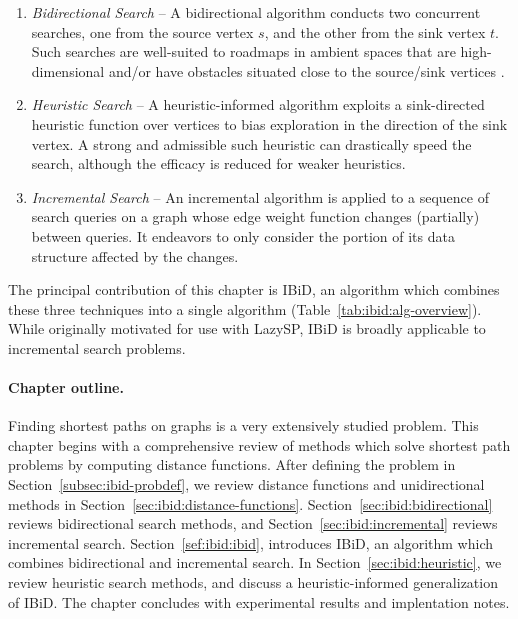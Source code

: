 \begin{enumerate}
\item \emph{Bidirectional Search} -- A bidirectional algorithm
   conducts two concurrent searches,
   one from the source vertex $s$,
   and the other from the sink vertex $t$.
   Such searches are well-suited to roadmaps in ambient spaces that
   are high-dimensional  and/or have
   obstacles situated close to the source/sink vertices
   .
\item \emph{Heuristic Search} -- A heuristic-informed algorithm
   exploits a sink-directed heuristic function over vertices to bias
   exploration in the direction of the sink vertex.
   A strong and admissible such heuristic can drastically speed the
   search, 
   although the efficacy is reduced for weaker heuristics.
\item \emph{Incremental Search} -- An incremental algorithm
   is applied to a sequence of search queries on a graph whose
   edge weight function changes (partially) between queries.
   It endeavors to only consider the portion of its data structure
   affected by the changes. 
\end{enumerate}

The principal contribution of this chapter is IBiD,
an algorithm which combines these three techniques into a single
algorithm
(Table~\ref{tab:ibid:alg-overview}).
While originally motivated for use with LazySP,
IBiD is broadly applicable to incremental search problems.

\paragraph{Chapter outline.}
Finding shortest paths on graphs is a very extensively studied problem.
This chapter begins with a comprehensive review of 
methods which solve shortest path problems by computing
distance functions.
After defining the problem in Section~\ref{subsec:ibid-probdef},
we review distance functions and unidirectional methods
in Section~\ref{sec:ibid:distance-functions}.
Section~\ref{sec:ibid:bidirectional} reviews
bidirectional search methods,
and Section~\ref{sec:ibid:incremental} reviews incremental search.
Section~\ref{sef:ibid:ibid}, introduces IBiD,
an algorithm which combines bidirectional and incremental search.
In Section~\ref{sec:ibid:heuristic},
we review heuristic search methods,
and discuss a heuristic-informed generalization of IBiD.
The chapter concludes with experimental results and implentation notes.

